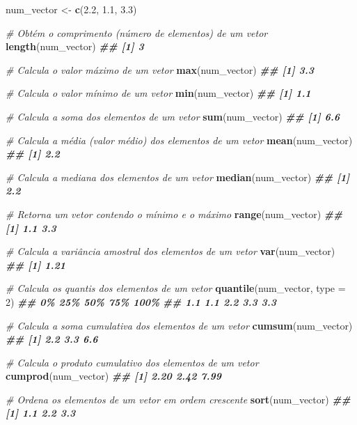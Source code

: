 \documentclass[
]{book}
\newenvironment{Shaded}{\begin{snugshade}}{\end{snugshade}}
\newcommand{\AttributeTok}[1]{\textcolor[rgb]{0.13,0.29,0.53}{#1}}
\newcommand{\CommentTok}[1]{\textcolor[rgb]{0.56,0.35,0.01}{\textit{#1}}}
\newcommand{\DecValTok}[1]{\textcolor[rgb]{0.00,0.00,0.81}{#1}}
\newcommand{\DocumentationTok}[1]{\textcolor[rgb]{0.56,0.35,0.01}{\textbf{\textit{#1}}}}
\newcommand{\FloatTok}[1]{\textcolor[rgb]{0.00,0.00,0.81}{#1}}
\newcommand{\FunctionTok}[1]{\textcolor[rgb]{0.13,0.29,0.53}{\textbf{#1}}}
\newcommand{\NormalTok}[1]{#1}
\newcommand{\OtherTok}[1]{\textcolor[rgb]{0.56,0.35,0.01}{#1}}
\begin{document}
\begin{Shaded}
\begin{Highlighting}[]
\NormalTok{num\_vector }\OtherTok{\textless{}{-}} \FunctionTok{c}\NormalTok{(}\FloatTok{2.2}\NormalTok{, }\FloatTok{1.1}\NormalTok{, }\FloatTok{3.3}\NormalTok{)}

\CommentTok{\# Obtém o comprimento (número de elementos) de um vetor}
\FunctionTok{length}\NormalTok{(num\_vector)}
\DocumentationTok{\#\# [1] 3}

\CommentTok{\# Calcula o valor máximo de um vetor}
\FunctionTok{max}\NormalTok{(num\_vector)}
\DocumentationTok{\#\# [1] 3.3}

\CommentTok{\# Calcula o valor mínimo de um vetor}
\FunctionTok{min}\NormalTok{(num\_vector)}
\DocumentationTok{\#\# [1] 1.1}

\CommentTok{\# Calcula a soma dos elementos de um vetor}
\FunctionTok{sum}\NormalTok{(num\_vector)}
\DocumentationTok{\#\# [1] 6.6}

\CommentTok{\# Calcula a média (valor médio) dos elementos de um vetor}
\FunctionTok{mean}\NormalTok{(num\_vector)}
\DocumentationTok{\#\# [1] 2.2}

\CommentTok{\# Calcula a mediana dos elementos de um vetor}
\FunctionTok{median}\NormalTok{(num\_vector)}
\DocumentationTok{\#\# [1] 2.2}

\CommentTok{\# Retorna um vetor contendo o mínimo e o máximo}
\FunctionTok{range}\NormalTok{(num\_vector)}
\DocumentationTok{\#\# [1] 1.1 3.3}

\CommentTok{\# Calcula a variância amostral dos elementos de um vetor}
\FunctionTok{var}\NormalTok{(num\_vector)}
\DocumentationTok{\#\# [1] 1.21}

\CommentTok{\# Calcula os quantis dos elementos de um vetor}
\FunctionTok{quantile}\NormalTok{(num\_vector, }\AttributeTok{type =} \DecValTok{2}\NormalTok{)}
\DocumentationTok{\#\#   0\%  25\%  50\%  75\% 100\% }
\DocumentationTok{\#\# 1.1  1.1  2.2  3.3  3.3 }

\CommentTok{\# Calcula a soma cumulativa dos elementos de um vetor}
\FunctionTok{cumsum}\NormalTok{(num\_vector)}
\DocumentationTok{\#\# [1] 2.2 3.3 6.6}

\CommentTok{\# Calcula o produto cumulativo dos elementos de um vetor}
\FunctionTok{cumprod}\NormalTok{(num\_vector)}
\DocumentationTok{\#\# [1] 2.20 2.42 7.99}

\CommentTok{\# Ordena os elementos de um vetor em ordem crescente}
\FunctionTok{sort}\NormalTok{(num\_vector)}
\DocumentationTok{\#\# [1] 1.1 2.2 3.3}


\end{Highlighting}
\end{Shaded}
\end{document}
